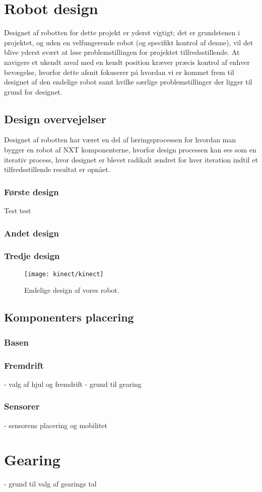 \section{Robot design}
Designet af robotten for dette projekt er yderst vigtigt; det er grundstenen i projektet, og uden en velfungerende robot (og specifikt kontrol af denne), vil det blive yderst svært at løse problemstillingen for projektet tilfredsstillende.
At navigere et ukendt areal med en kendt position kræver præcis kontrol af enhver bevægelse, hvorfor dette afsnit fokuserer på hvordan vi er kommet frem til designet af den endelige robot samt hvilke særlige problemstillinger der ligger til grund for designet.

\subsection{Design overvejelser}
Designet af robotten har været en del af læringsprocessen for hvordan man bygger en robot af \lego NXT komponenterne, hvorfor design processen kan ses som en iterativ process, hvor designet er blevet radikalt ændret for hver iteration indtil et tilfredsstillende resultat er opnået.

\subsubsection{Første design}
Test test 

\subsubsection{Andet design}

\subsubsection{Tredje design}


\begin{figure}
\centering
\texttt{[image: kinect/kinect]}
\caption{Endelige design af vores robot.}
\label{robot:opbygning}
\end{figure}

\subsection{Komponenters placering}


\subsubsection{Basen}

\subsubsection{Fremdrift}
- valg af hjul og fremdrift
- grund til gearing

\subsubsection{Sensorer}
- sensorens placering og mobilitet


\section{Gearing}
- grund til valg af gearings tal